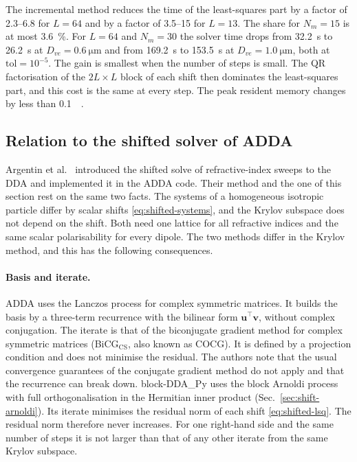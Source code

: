 \documentclass[11pt,a4paper]{article}
\begin{document}
The incremental method reduces the time of the least-squares part by a
factor of \numrange{2.3}{6.8} for $L = 64$ and by a factor of
\numrange{3.5}{15} for $L = 13$.
The share for $N_m = 15$ is at most \SI{3.6}{\percent}.
For $L = 64$ and $N_m = 30$ the solver time drops from
\SI{32.2}{\second} to \SI{26.2}{\second} at
$D_{ve} = \SI{0.6}{\micro\meter}$ and from \SI{169.2}{\second} to
\SI{153.5}{\second} at $D_{ve} = \SI{1.0}{\micro\meter}$, both at
$\text{tol} = 10^{-5}$.
The gain is smallest when the number of steps is small.
The QR factorisation of the $2L \times L$ block of each shift then
dominates the least-squares part, and this cost is the same at every
step.
The peak resident memory changes by less than \SI{0.1}{\gibi\byte}.

\subsection{Relation to the shifted solver of ADDA}
\label{sec:shift-related}

Argentin et al.~\cite{Argentin2026} introduced the shifted solve of
refractive-index sweeps to the DDA and implemented it in the ADDA code.
Their method and the one of this section rest on the same two facts.
The systems of a homogeneous isotropic particle differ by scalar shifts
\eqref{eq:shifted-systems}, and the Krylov subspace does not depend on
the shift.
Both need one lattice for all refractive indices and the same scalar
polarisability for every dipole.
The two methods differ in the Krylov method, and this has the following
consequences.

\paragraph{Basis and iterate.}
ADDA uses the Lanczos process for complex symmetric matrices.
It builds the basis by a three-term recurrence with the bilinear form
$\bm{u}^\top \bm{v}$, without complex conjugation.
The iterate is that of the biconjugate gradient method for complex
symmetric matrices (BiCG$_{\text{CS}}$, also known as COCG).
It is defined by a projection condition and does not minimise the
residual.
The authors note that the usual convergence guarantees of the
conjugate gradient method do not apply and that the recurrence can
break down.
block-DDA\_Py uses the block Arnoldi process with full orthogonalisation
in the Hermitian inner product (Sec.~\ref{sec:shift-arnoldi}).
Its iterate minimises the residual norm of each shift
\eqref{eq:shifted-lsq}.
The residual norm therefore never increases.
For one right-hand side and the same number of steps it is not larger
than that of any other iterate from the same Krylov subspace.
\end{document}
